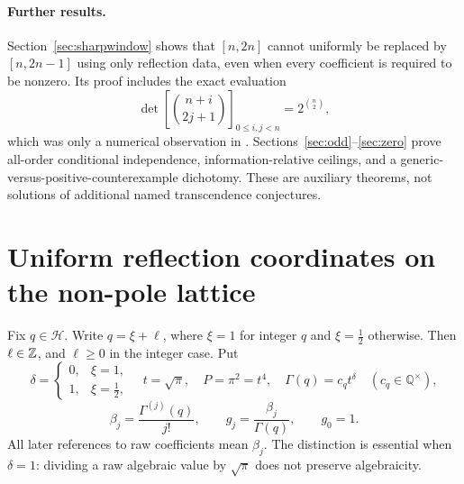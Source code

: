 \documentclass[11pt,a4paper]{article}
\theoremstyle{definition}\newtheorem{definition}[theorem]{Definition}
\theoremstyle{remark}\newtheorem{remark}[theorem]{Remark}
\newcommand{\Q}{\mathbb Q}\newcommand{\Qb}{\overline{\mathbb Q}}
\begin{document}
\paragraph{Further results.}
Section~\ref{sec:sharpwindow} shows that $[n,2n]$ cannot uniformly be replaced by $[n,2n-1]$ using only reflection data, even when every coefficient is required to be nonzero. Its proof includes the exact evaluation
\[
\det\!\left[\binom{n+i}{2j+1}\right]_{0\le i,j<n}=2^{\binom n2},
\]
which was only a numerical observation in \cite{Window}. Sections~\ref{sec:odd}--\ref{sec:zero} prove all-order conditional independence, information-relative ceilings, and a generic-versus-positive-counterexample dichotomy. These are auxiliary theorems, not solutions of additional named transcendence conjectures.

\section{Uniform reflection coordinates on the non-pole lattice}\label{sec:reflection}
Fix $q\in\mathcal H$. Write $q=\xi+\ell$, where $\xi=1$ for integer $q$ and $\xi=\tfrac12$ otherwise. Then $\ell\in\mathbb Z$, and $\ell\ge0$ in the integer case. Put
\[
\delta=\begin{cases}0,&\xi=1,\\1,&\xi=\tfrac12,\end{cases}
\quad t=\sqrt\pi,\quad P=\pi^2=t^4,\quad
\Gamma(q)=c_q t^\delta\quad(c_q\in\Q^\times),
\]
\[
\beta_j=\frac{\Gamma^{(j)}(q)}{j!},\qquad
 g_j=\frac{\beta_j}{\Gamma(q)},\qquad g_0=1.
\]
All later references to raw coefficients mean $\beta_j$. The distinction is essential when $\delta=1$: dividing a raw algebraic value by $\sqrt\pi$ does not preserve algebraicity.
\end{document}
